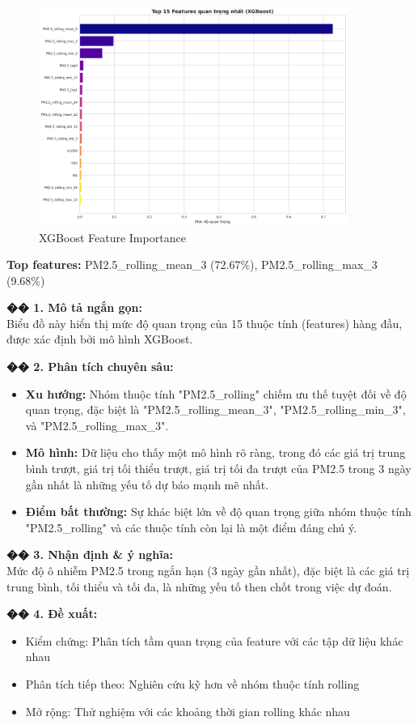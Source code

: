 \documentclass[12pt,a4paper]{article}
\begin{document}
\begin{figure}[H]
\centering
\includegraphics[width=0.9\textwidth]{results_comb_PM25_Hanoi_2018_sm_20251011_121424/20251011_121424_xgb_feature_importance.png}
\caption{XGBoost Feature Importance}
\end{figure}

\begin{aibox}
\textbf{Top features:} PM2.5\_rolling\_mean\_3 (72.67\%), PM2.5\_rolling\_max\_3 (9.68\%)

\textbf{�� 1. Mô tả ngắn gọn:}\\
Biểu đồ này hiển thị mức độ quan trọng của 15 thuộc tính (features) hàng đầu, được xác định bởi mô hình XGBoost.

\textbf{�� 2. Phân tích chuyên sâu:}
\begin{itemize}
    \item \textbf{Xu hướng:} Nhóm thuộc tính "PM2.5\_rolling" chiếm ưu thế tuyệt đối về độ quan trọng, đặc biệt là "PM2.5\_rolling\_mean\_3", "PM2.5\_rolling\_min\_3", và "PM2.5\_rolling\_max\_3".
    \item \textbf{Mô hình:} Dữ liệu cho thấy một mô hình rõ ràng, trong đó các giá trị trung bình trượt, giá trị tối thiểu trượt, giá trị tối đa trượt của PM2.5 trong 3 ngày gần nhất là những yếu tố dự báo mạnh mẽ nhất.
    \item \textbf{Điểm bất thường:} Sự khác biệt lớn về độ quan trọng giữa nhóm thuộc tính "PM2.5\_rolling" và các thuộc tính còn lại là một điểm đáng chú ý.
\end{itemize}

\textbf{�� 3. Nhận định \& ý nghĩa:}\\
Mức độ ô nhiễm PM2.5 trong ngắn hạn (3 ngày gần nhất), đặc biệt là các giá trị trung bình, tối thiểu và tối đa, là những yếu tố then chốt trong việc dự đoán.

\textbf{�� 4. Đề xuất:}
\begin{itemize}
    \item Kiểm chứng: Phân tích tầm quan trọng của feature với các tập dữ liệu khác nhau
    \item Phân tích tiếp theo: Nghiên cứu kỹ hơn về nhóm thuộc tính rolling
    \item Mở rộng: Thử nghiệm với các khoảng thời gian rolling khác nhau
\end{itemize}
\end{aibox}
\end{document}
